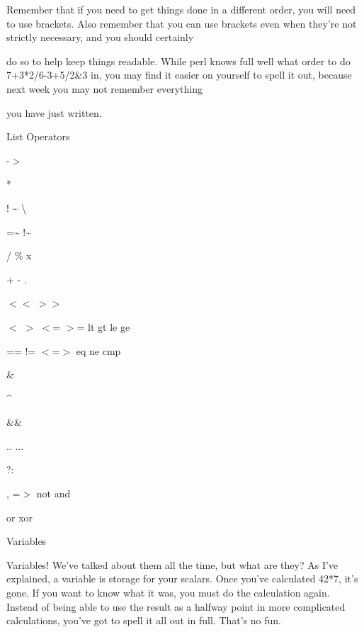\documentclass[a4paper,11pt]{book}
\begin{document}
\noindent 

\noindent Remember that if you need to get things done in a different order, you will need to use brackets. Also remember that you can use brackets even when they're not strictly necessary, and you should certainly

\noindent do so to help keep things readable. While perl knows full well what order to do 7+3*2/6-3+5/2\&3 in, you may find it easier on yourself to spell it out, because next week you may not remember everything

\noindent you have just written.

\noindent 

\noindent 

\noindent List Operators

\noindent 

\noindent -$>$

\noindent **

\noindent ! \~{} \textbackslash 

\noindent =\~{} !\~{}

\noindent * / \% x

\noindent + - .

\noindent $<$$<$ $>$$>$

\noindent $<$ $>$ $<$= $>$= lt gt le ge

\noindent == != $<$=$>$ eq ne cmp

\noindent \&

\noindent \textbar  \^{}

\noindent \&\&

\noindent \textbar \textbar 

\noindent .. ...

\noindent ?:

\noindent , =$>$ not and

\noindent or xor

\noindent 

\noindent 

\noindent Variables

\noindent 

\noindent Variables! We've talked about them all the time, but what are they? As I've explained, a variable is storage for your scalars. Once you've calculated 42*7, it's gone. If you want to know what it was, you must do the calculation again. Instead of being able to use the result as a halfway point in more complicated calculations, you've got to spell it all out in full. That's no fun.

\noindent 
\end{document}
